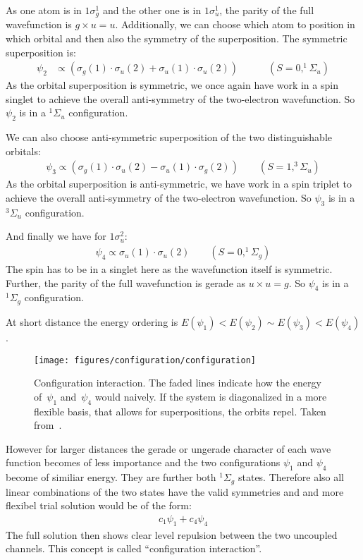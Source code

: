 \documentclass[10pt]{article}
\let\cite\citep
\providecommand\citep{\cite}
\begin{document}
As one atom is in $1\sigma_g^{1}$ and the other one is in $1\sigma_u^{1}$, the parity of the full wavefunction is $g\times u = u$. Additionally, we can choose which atom to position in which orbital and then also the symmetry of the superposition. The symmetric superposition is:
\begin{align}
\psi_{2} &\propto \left (\sigma_g(1) \cdot \sigma_u(2) + \sigma_u(1) \cdot \sigma_u(2)\right) \quad \qquad (S=0, ^1\Sigma_u)
\end{align}
As the orbital superposition is symmetric, we once again have work in a spin singlet to achieve the overall anti-symmetry of the two-electron wavefunction. So $\psi_2$ is in a $^1\Sigma_u$ configuration.

We can also choose anti-symmetric superposition of the two distinguishable orbitals:
\begin{align}
\psi_3 \propto \left( \sigma_g(1)\cdot \sigma_u(2)-\sigma_u(1) \cdot \sigma_g(2) \right) \qquad (S=1, ^3\Sigma_u)
\end{align}
As the orbital superposition is anti-symmetric, we have work in a spin triplet to achieve the overall anti-symmetry of the two-electron wavefunction. So $\psi_3$ is in a $^3\Sigma_u$ configuration.

And finally we have for $1\sigma_u^{2}$:
\begin{align}
\psi_4 \propto \sigma_u(1)\cdot \sigma_u(2) \qquad (S=0, ^1\Sigma_g)
\end{align}
The spin has to be in a singlet here as the wavefunction itself is symmetric. Further, the parity of the full wavefunction is gerade as $u \times u = g$. So $\psi_4$ is in a $^1\Sigma_g$ configuration.


At short distance the energy ordering is $E(\psi_1) < E(\psi_2) \sim E(\psi_3) < E(\psi_4)$.
\begin{figure}[h!]
\begin{center}
\texttt{[image: figures/configuration/configuration]}
\caption{{Configuration interaction. The faded lines indicate how the energy
of~\(\psi_1\) and~\(\psi_4\) would naively. If the
system is diagonalized in a more flexible basis, that allows for
superpositions, the orbits repel. Taken from~\protect\cite{mechanics}.
{\label{953307}}%
}}
\end{center}
\end{figure}

However for larger distances the gerade or ungerade character of each wave function becomes of less importance and the two configurations $\psi_1$ and $\psi_4$ become of similiar energy. They are further both $^1\Sigma_g$ states. Therefore also all linear combinations of the two  states have the valid symmetries and and more flexibel trial solution would be of the form:
\begin{align}
c_1 \psi_1 + c_4 \psi_4
\end{align}
The full solution then shows clear level repulsion between the two uncoupled channels. This concept is called ``configuration interaction''.
\end{document}
